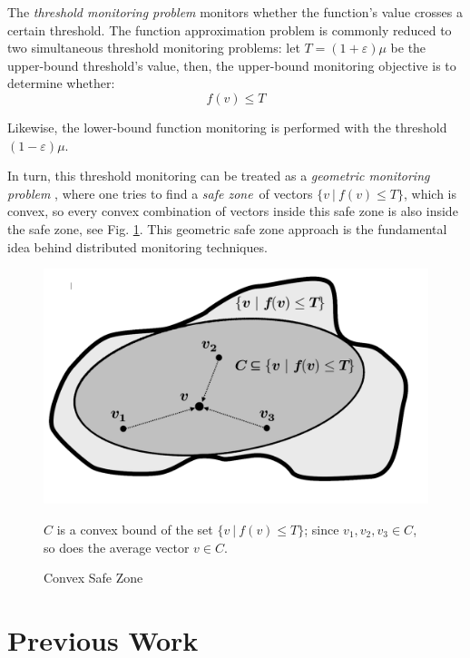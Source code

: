\documentclass[11pt, conference]{article}
\newcommand{\safeZone}{\textit{safe zone}}
\begin{document}
The \textit{threshold monitoring problem} \cite{garofalakis2013sketch}  monitors whether the function's value crosses a certain threshold. The function approximation problem is commonly reduced to two simultaneous threshold monitoring problems: let ${T = (1+\varepsilon )\mu}$ be the upper-bound threshold's value, then, the upper-bound monitoring objective is to determine whether:
\begin{equation}
f(v) \leq T
\end{equation}

Likewise, the lower-bound function monitoring is performed with the threshold ${(1-\varepsilon )\mu}$.

In turn, this threshold monitoring can be treated as a \textit{geometric monitoring problem} \cite{sharfman2007geometric}, where one tries to find a \safeZone \ of vectors ${\{v \ | \ f(v) \leq T\}}$, which is convex, so every convex combination of vectors inside this safe zone is also inside the safe zone, see Fig. \ref{fig:ConvexSafeZoneSketch}. This geometric safe zone approach is the fundamental idea behind distributed monitoring techniques.

\begin{figure}[h]
\begin{center}
\includegraphics[width=0.7\linewidth]{Pics/PNGs/ConvexSafeZone.png}
\end{center}
\caption{Convex Safe Zone}
\label{fig:ConvexSafeZoneSketch}
\medskip
\small
\begin{center}
$C$ is a convex bound of the set ${\{v \ | \ f(v) \leq T\}}$; since ${v_1,v_2,v_3 \in C}$, so does the average vector $v \in C$.
\end{center}
\end{figure}

\section{Previous Work}
\end{document}
